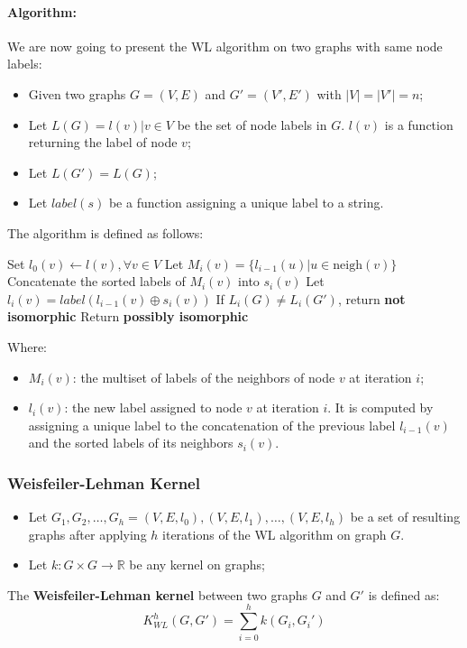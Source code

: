 \paragraph{Algorithm:}
We are now going to present the WL algorithm on two graphs with same node labels:
\begin{itemize}
    \item Given two graphs $G = (V, E)$ and $G' = (V', E')$ with $|V| = |V'| = n$;
    \item Let $L(G) = {l(v)| v \in V} $ be the set of node labels in $G$. $l(v)$ is a function returning the label of node $v$; 
    \item Let $L(G') = L(G)$;
    \item Let $label(s)$ be a function assigning a unique label to a string.
\end{itemize}
The algorithm is defined as follows:
\begin{algorithm}[H]
    \caption{Weisfeiler-Lehman Test}
    \begin{algorithmic}
        \State Set $l_0(v) \leftarrow l(v), \forall v \in V$
                \State Let $M_i(v) = \{l_{i-1}(u) | u \in \text{neigh}(v)\}$
                \State Concatenate the sorted labels of $M_i(v)$ into $s_i(v)$
                \State Let $l_i(v) = label(l_{i-1}(v) \oplus s_i(v))$
            \EndFor
            \State If $L_i(G) \neq L_i(G')$, return \textbf{not isomorphic}
        \EndFor
        \State Return \textbf{possibly isomorphic}
    \end{algorithmic}
\end{algorithm}
Where:
\begin{itemize}
    \item $M_i(v)$: the multiset of labels of the neighbors of node $v$ at iteration $i$;
    \item $l_i(v)$: the new label assigned to node $v$ at iteration $i$. It is computed by assigning a unique label 
    to the concatenation of the previous label $l_{i-1}(v)$ and the sorted labels of its neighbors $s_i(v)$.
\end{itemize}
\subsubsection{Weisfeiler-Lehman Kernel}
\begin{itemize}
    \item Let ${G_1, G_2, \ldots, G_h} = {(V, E, l_0), (V, E, l_1), \ldots, (V, E, l_h)}$ be a set of resulting graphs after applying $h$ iterations of the WL algorithm on graph $G$.
    \item Let $k: G \times G \to \mathbb{R}$ be any kernel on graphs;
\end{itemize}
The \textbf{Weisfeiler-Lehman kernel} between two graphs $G$ and $G'$ is defined as:
\begin{equation}
    K_{WL}^{h}(G, G') = \sum_{i=0}^h k(G_i, G_i')
\end{equation}
